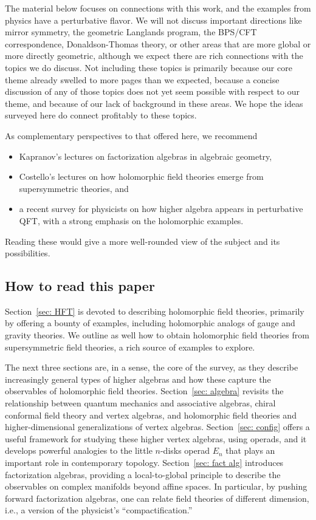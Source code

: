 \documentclass[11pt]{amsart}
\begin{document}
The material below focuses on connections with this work,
and the examples from physics have a perturbative flavor.
We will not discuss important directions like mirror symmetry, the geometric Langlands program, the BPS/CFT correspondence, Donaldson-Thomas theory, or other areas that are more global or more directly geometric,
although we expect there are rich connections with the topics we do discuss.
Not including these topics is primarily because our core theme already swelled to more pages than we expected, 
because a concise discussion of any of those topics does not yet seem possible with respect to our theme,
and because of our lack of background in these areas.
We hope the ideas surveyed here do connect profitably to these topics.


As complementary perspectives to that offered here, we recommend
\begin{itemize}
\item Kapranov's lectures \cite{KapLect} on factorization algebras in algebraic geometry,
\item Costello's lectures \cite{CosScheim} on how holomorphic field theories emerge from supersymmetric theories, and
\item a recent survey \cite{GKW} for physicists on how higher algebra appears in perturbative QFT, with a strong emphasis on the holomorphic examples.
\end{itemize}
Reading these would give a more well-rounded view of the subject and its possibilities.

\subsection{How to read this paper}

Section~\ref{sec: HFT} is devoted to describing holomorphic field theories, primarily by offering a bounty of examples, including holomorphic analogs of gauge and gravity theories.
We outline as well how to obtain holomorphic field theories from supersymmetric field theories,
a rich source of examples to explore.

The next three sections are, in a sense, the core of the survey,
as they describe increasingly general types of higher algebras and how these capture the observables of holomorphic field theories.
Section~\ref{sec: algebra} revisits the relationship between quantum mechanics and associative algebras,
chiral conformal field theory and vertex algebras,
and holomorphic field theories and higher-dimensional generalizations of vertex algebras.
Section~\ref{sec: config} offers a useful framework for studying these higher vertex algebras,
using operads,
and it develops powerful analogies to the little $n$-disks operad $E_n$ that plays an important role in contemporary topology.
Section~\ref{sec: fact alg} introduces factorization algebras,
providing a local-to-global principle to describe the observables on complex manifolds beyond affine spaces.
In particular, by pushing forward factorization algebras,
one can relate field theories of different dimension,
i.e., a version of the physicist's ``compactification.''
\end{document}
